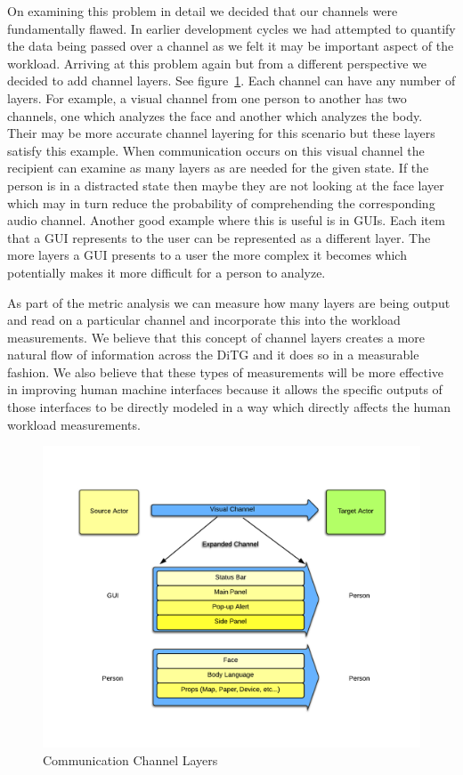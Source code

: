 On examining this problem in detail we decided that our channels were fundamentally flawed.  In earlier development cycles we had attempted to quantify the data being passed over a channel as we felt it may be important aspect of the workload.  Arriving at this problem again but from a different perspective we decided to add channel layers. See figure~\ref{fig:layers}.  Each channel can have any number of layers.  For example, a visual channel from one person to another has two channels, one which analyzes the face and another which analyzes the body.  Their may be more accurate channel layering for this scenario but these layers satisfy this example.  When communication occurs on this visual channel the recipient can examine as many layers as are needed for the given state.  If the person is in a distracted state then maybe they are not looking at the face layer which may in turn reduce the probability of comprehending the corresponding audio channel.   Another good example where this is useful is in GUIs.  Each item that a GUI represents to the user can be represented as a different layer.  The more layers a GUI presents to a user the more complex it becomes which potentially makes it more difficult for a person to analyze.

As part of the metric analysis we can measure how many layers are being output and read on a particular channel and incorporate this into the workload measurements.  We believe that this concept of channel layers creates a more natural flow of information across the DiTG and it does so in a measurable fashion.  We also believe that these types of measurements will be more effective in improving human machine interfaces because it allows the specific outputs of those interfaces to be directly modeled in a way which directly affects the human workload measurements. 

\begin{figure}[h]
\begin{center}
\includegraphics[width=5in]{layers.png}
\caption{Communication Channel Layers}
\label{fig:layers}
\end{center}
\end{figure}
